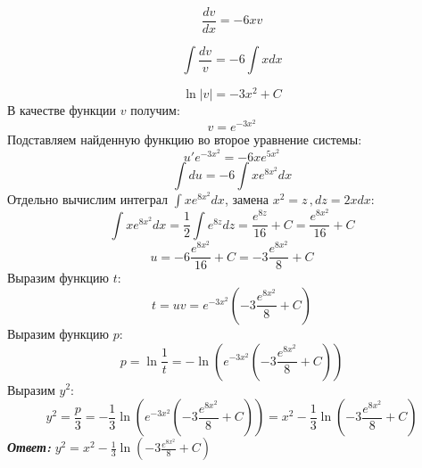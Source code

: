 \documentclass[a5paper, 10pt]{article}
\theoremstyle{definition}
\theoremstyle{plain}
\theoremstyle{remark}
\begin{document}
\begin{equation*}
   \frac{dv}{dx} = -6xv
\end{equation*}

\begin{equation*}
  \int  \frac{dv}{v} = -6 \int x dx 
\end{equation*}

\begin{equation*}
  \ln | v |= -3 x^2 + C
\end{equation*}
В качестве функции $v$ получим:
\begin{equation*}
   v = e^{ -3 x^2 }
\end{equation*}
Подставляем найденную функцию во второе уравнение системы:
\begin{equation*}
   u' e^{ -3 x^2 }= - 6x e^{5x^2}
\end{equation*}
\begin{equation*}
 \int  du = - 6 \int x e^{8x^2} dx
\end{equation*}
Отдельно вычислим интеграл $ \int x e^{8x^2} dx$, замена $ x^2 = z\, , dz = 2xdx$:
\begin{equation*}
 \int x e^{8x^2} dx = \frac{1}{2} \int e^{8z}dz = \frac{e^{8z}}{16}  + C = \frac{e^{8x^2}}{16}  + C
\end{equation*}
\begin{equation*}
 u = - 6 \frac{e^{8x^2}}{16}  + C =  - 3 \frac{e^{8x^2}}{8}  + C
\end{equation*}
Выразим функцию $t$:
\begin{equation*}
 t = uv = e^{ -3 x^2 } \left(  - 3 \frac{e^{8x^2}}{8}  + C \right)
\end{equation*}
Выразим функцию $p$:
\begin{equation*}
 p = \ln \frac{1}{t} = - \ln \left(   e^{ -3 x^2 } \left(  - 3 \frac{e^{8x^2}}{8}  + C \right)  \right)
\end{equation*}
Выразим $y^2$:
\begin{equation*}
y^2 = \frac{p}{3} = -\frac{1}{3}\ln \left(   e^{ -3 x^2 } \left(  - 3 \frac{e^{8x^2}}{8}  + C \right)  \right) = x^2 - \frac{1}{3}\ln \left(  - 3 \frac{e^{8x^2}}{8}  + C  \right)
\end{equation*}
\textit{\textbf{Ответ:}} $y^2 =  x^2 - \frac{1}{3}\ln \left(  - 3 \frac{e^{8x^2}}{8}  + C  \right)$
\end{document}
